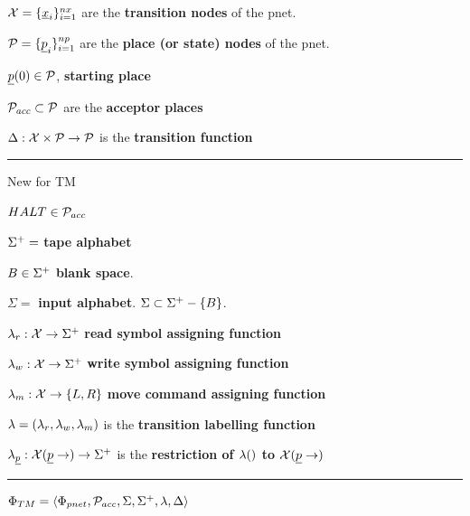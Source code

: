 $\calx =\{\rvx_i\}_{i=1}^{nx}$ are the {\bf transition nodes} of the pnet.

$\calp =\{\rvp_i\}_{i=1}^{np}$ are the {\bf place (or state) nodes} of the pnet.

$\rvp(0)\in \calp$, {\bf starting place }

${\cal P}_{acc}\subset {\cal P}$ are the 
{\bf acceptor places}

$\Delta:{\cal X}\times{\cal P}\rightarrow {\cal P}$ is the 
{\bf transition function}
\hrule
New for TM

$HALT\in {\cal P}_{acc}$

$\Sigma^+ =$ {\bf tape alphabet}

$B\in \Sigma^+$ {\bf blank space}.

$\Sigma=$ {\bf input alphabet}. $\Sigma\subset\Sigma^+-\{B\}$. 

$\lambda_{r}:{\cal X}\rightarrow \Sigma^+$ {\bf read symbol assigning function}

$\lambda_{w}:{\cal X}\rightarrow \Sigma^+$ {\bf write symbol assigning function}

$\lambda_{m}:{\cal X}\rightarrow \{L,R\}$ {\bf move command
assigning function}

$\lambda = (\lambda_r, \lambda_w, \lambda_m)$ is the
{\bf transition labelling function}

$\lam_\rvp: \calx(\rvp\rarrow)\rarrow \TA$ is the
{\bf restriction of $\lambda()$ to $\calx(\rvp\rarrow)$}

\hrule
$\Phi_{TM}=\left\langle\Phi_{pnet},{\cal P}_{acc}, \Sigma,
\Sigma^+, \lambda, \Delta\right\rangle$



